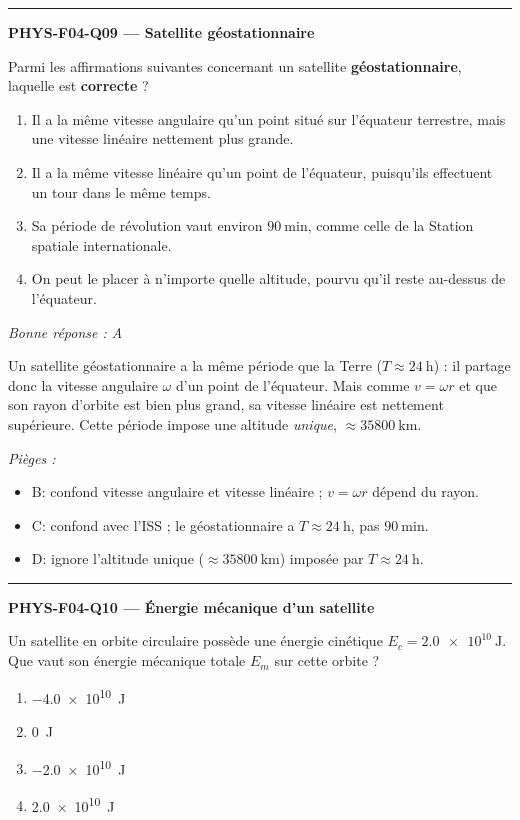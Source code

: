 \documentclass[11pt,a4paper]{article}
\begin{document}
\vspace{8pt}\hrule\vspace{8pt}
\noindent\textbf{PHYS-F04-Q09 --- Satellite géostationnaire}\par
Parmi les affirmations suivantes concernant un satellite \textbf{géostationnaire}, laquelle est \textbf{correcte} ?
\begin{enumerate}[label=\Alph*)]
\item Il a la même vitesse angulaire qu'un point situé sur l'équateur terrestre, mais une vitesse linéaire nettement plus grande.
\item Il a la même vitesse linéaire qu'un point de l'équateur, puisqu'ils effectuent un tour dans le même temps.
\item Sa période de révolution vaut environ $\qty{90}{\minute}$, comme celle de la Station spatiale internationale.
\item On peut le placer à n'importe quelle altitude, pourvu qu'il reste au-dessus de l'équateur.
\end{enumerate}
\textit{Bonne réponse : A}\par
Un satellite géostationnaire a la même période que la Terre ($T\approx\qty{24}{\hour}$) : il partage donc la vitesse angulaire $\omega$ d'un point de l'équateur. Mais comme $v=\omega r$ et que son rayon d'orbite est bien plus grand, sa vitesse linéaire est nettement supérieure. Cette période impose une altitude \emph{unique}, $\approx\qty{35800}{\kilo\metre}$.\par
\textit{Pièges :}
\begin{itemize}
\item B: confond vitesse angulaire et vitesse linéaire ; $v=\omega r$ dépend du rayon.
\item C: confond avec l'ISS ; le géostationnaire a $T\approx\qty{24}{\hour}$, pas $\qty{90}{\minute}$.
\item D: ignore l'altitude unique ($\approx\qty{35800}{\kilo\metre}$) imposée par $T\approx\qty{24}{\hour}$.
\end{itemize}
\vspace{8pt}\hrule\vspace{8pt}
\noindent\textbf{PHYS-F04-Q10 --- Énergie mécanique d'un satellite}\par
Un satellite en orbite circulaire possède une énergie cinétique $E_c=\qty{2.0e10}{\joule}$. Que vaut son énergie mécanique totale $E_m$ sur cette orbite ?
\begin{enumerate}[label=\Alph*)]
\item \qty{-4.0e10}{\joule}
\item \qty{0}{\joule}
\item \qty{-2.0e10}{\joule}
\item \qty{+2.0e10}{\joule}
\end{enumerate}
\end{document}
